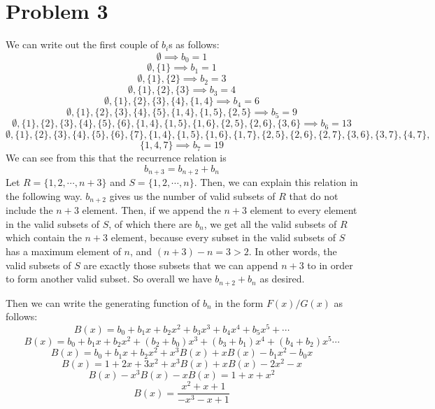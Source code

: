 \documentclass{article}
\begin{document}
\section*{Problem 3}
We can write out the first couple of $b_i$s as follows:
\[ \emptyset \implies b_0 = 1 \]
\[ \emptyset, \{1\} \implies b_1 = 1 \]
\[ \emptyset, \{1\}, \{2\} \implies b_2 = 3 \]
\[ \emptyset, \{1\}, \{2\}, \{3\} \implies b_3 = 4 \]
\[ \emptyset, \{1\}, \{2\}, \{3\}, \{4\}, \{1,4\} \implies b_4 = 6 \]
\[ \emptyset, \{1\}, \{2\}, \{3\}, \{4\}, \{5\}, \{1,4\}, \{1,5\}, \{2,5\}
    \implies b_5 = 9 \]
\[ \emptyset, \{1\}, \{2\}, \{3\}, \{4\}, \{5\}, \{6\}, \{1,4\}, \{1,5\}, \{1,6\},
    \{2,5\}, \{2,6\}, \{3,6\}
    \implies b_6 = 13 \]
\[ \emptyset, \{1\}, \{2\}, \{3\}, \{4\}, \{5\}, \{6\}, \{7\}, \{1,4\}, \{1,5\},
    \{1,6\}, \{1,7\}, \{2,5\}, \{2,6\}, \{2,7\}, \{3,6\}, \{3,7\}, \{4,7\}, \]
\[ \{1,4,7\} \implies b_7 = 19 \]
We can see from this that the recurrence relation is
\[ b_{n+3} = b_{n+2} + b_n \]
Let $R = \{1,2,\cdots, n+3\}$ and $S = \{1,2,\cdots,n\}$.
Then, we can explain this relation in the following way. $b_{n+2}$ gives us the
number of valid subsets of $R$ that do not include the $n+3$ element. Then, if
we append the $n+3$ element to every element in the valid subsets of $S$,
of which there are $b_n$, we get all the valid subsets of $R$ which contain
the $n+3$ element, because every subset in the valid subsets of $S$ has a maximum
element of $n$, and $(n+3) - n = 3 > 2$. In other words, the valid subsets of $S$
are exactly those subsets that we can append $n+3$ to in order to form another
valid subset. So overall we have $b_{n+2} + b_n$ as desired.

\vspace{3mm}
\noindent Then we can write the generating function of $b_n$ in the form
$F(x)/G(x)$ as follows:
\[ B(x) = b_0 + b_1x + b_2x^2 + b_3x^3 + b_4x^4 + b_5x^5 + \cdots \]
\[ B(x) = b_0 + b_1x + b_2x^2 + (b_2 + b_0)x^3 + (b_3 + b_1)x^4 + (b_4 + b_2)x^5
    \cdots \]
\[ B(x) = b_0 + b_1x + b_2x^2 + x^3B(x) + xB(x) - b_1x^2 - b_0x \]
\[ B(x) = 1 + 2x + 3x^2 + x^3B(x) + xB(x) - 2x^2 - x \]
\[ B(x) - x^3B(x) - xB(x) = 1 + x + x^2 \]
\[ B(x) = \frac{x^2 + x + 1}{-x^3 - x + 1} \]

\end{document}
